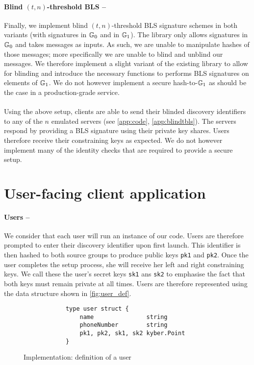   	\paragraph{Blind $(t,n)$-threshold BLS --} Finally, we implement blind $(t,n)$-threshold BLS signature schemes in both variants (with signatures in $\mathbb{G}_0$ and in $\mathbb{G}_1$). The \kyber\;library only allows signatures in $\mathbb{G}_0$ and takes messages as inputs. As such, we are unable to manipulate hashes of those messages; more specifically we are unable to blind and unblind our messages. We therefore implement a slight variant of the existing library to allow for blinding and introduce the necessary functions to performs BLS signatures on elements of $\mathbb{G}_1$. We do not however implement a secure hash-to-$\mathbb{G}_1$ as should be the case in a production-grade service.
  	
  	\paragraph{} Using the above setup, clients are able to send their blinded discovery identifiers to any of the $n$ emulated servers (see \autoref{app:code}, \autoref{app:blindtbls}). The servers respond by providing a BLS signature using their private key shares. Users therefore receive their constraining keys as expected. We do not however implement many of the identity checks that are required to provide a secure setup.
  	
\section{User-facing client application}

	\paragraph{Users --} We consider that each user will run an instance of our code. Users are therefore prompted to enter their discovery identifier upon first launch. This identifier is then hashed to both source groups to produce public keys \texttt{pk1} and \texttt{pk2}. Once the user completes the setup process, she will receive her left and right constraining keys. We call these the user's secret keys \texttt{sk1} ans \texttt{sk2} to emphasise the fact that both keys must remain private at all times. Users are therefore represented using the data structure shown in \autoref{fig:user_def}.
	
	\begin{figure}[H]
	\begin{center}
		\begin{lstlisting}
			type user struct {
				name               string
				phoneNumber        string
				pk1, pk2, sk1, sk2 kyber.Point
			}
		\end{lstlisting}
	\caption{Implementation: definition of a user}
	\label{fig:user_def}
	\end{center}
\end{figure}


